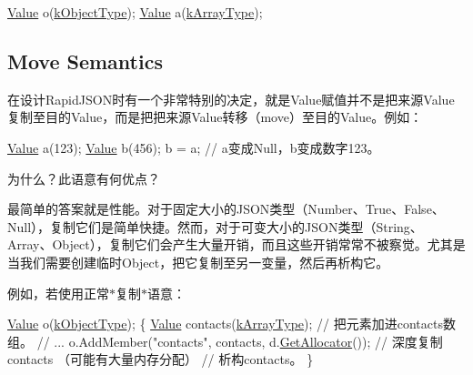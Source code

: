\begin{DoxyCode}
\hyperlink{class_generic_value}{Value} o(\hyperlink{rapidjson_8h_a1d1cfd8ffb84e947f82999c682b666a7a146f46700e905e8df96a6a90b5c7640f}{kObjectType});
\hyperlink{class_generic_value}{Value} a(\hyperlink{rapidjson_8h_a1d1cfd8ffb84e947f82999c682b666a7af41527d6925efa3c5c3dadb23dfef7c8}{kArrayType});
\end{DoxyCode}
\hypertarget{md_Cadriciel_Commun_Externe_RapidJSON_doc_tutorial.zh-cn_MoveSemantics}{}\subsection{Move Semantics}\label{md_Cadriciel_Commun_Externe_RapidJSON_doc_tutorial.zh-cn_MoveSemantics}
在设计\+Rapid\+J\+S\+O\+N时有一个非常特别的决定，就是\+Value赋值并不是把来源\+Value复制至目的\+Value，而是把把来源\+Value转移（move）至目的\+Value。例如：


\begin{DoxyCode}
\hyperlink{class_generic_value}{Value} a(123);
\hyperlink{class_generic_value}{Value} b(456);
b = a;         \textcolor{comment}{// a变成Null，b变成数字123。}
\end{DoxyCode}




为什么？此语意有何优点？

最简单的答案就是性能。对于固定大小的\+J\+S\+O\+N类型（\+Number、\+True、\+False、\+Null），复制它们是简单快捷。然而，对于可变大小的\+J\+S\+O\+N类型（\+String、\+Array、\+Object），复制它们会产生大量开销，而且这些开销常常不被察觉。尤其是当我们需要创建临时\+Object，把它复制至另一变量，然后再析构它。

例如，若使用正常$\ast$复制$\ast$语意：


\begin{DoxyCode}
\hyperlink{class_generic_value}{Value} o(\hyperlink{rapidjson_8h_a1d1cfd8ffb84e947f82999c682b666a7a146f46700e905e8df96a6a90b5c7640f}{kObjectType});
\{
    \hyperlink{class_generic_value}{Value} contacts(\hyperlink{rapidjson_8h_a1d1cfd8ffb84e947f82999c682b666a7af41527d6925efa3c5c3dadb23dfef7c8}{kArrayType});
    \textcolor{comment}{// 把元素加进contacts数组。}
    \textcolor{comment}{// ...}
    o.AddMember(\textcolor{stringliteral}{"contacts"}, contacts, d.\hyperlink{class_generic_document_aa4609d6b19f86aec1a6b96edf2c27686}{GetAllocator}());  \textcolor{comment}{// 深度复制contacts （可能有大量内存分配）}
    \textcolor{comment}{// 析构contacts。}
\}
\end{DoxyCode}




